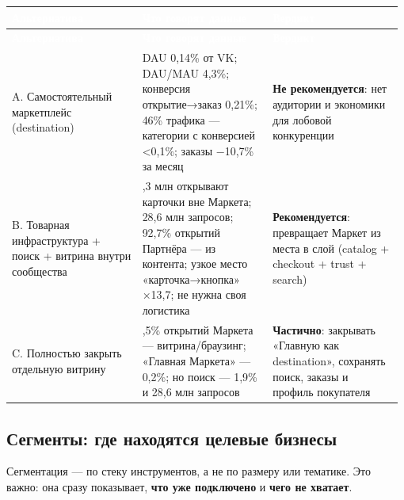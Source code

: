 \documentclass[10pt,a4paper]{article}
\begin{document}
\begingroup
\small
\setlength{\tabcolsep}{3pt}
\renewcommand{\arraystretch}{1.12}
\begin{longtable}{@{}>{\raggedright\arraybackslash}p{0.3251\linewidth}>{\raggedright\arraybackslash}p{0.3251\linewidth}>{\raggedright\arraybackslash}p{0.3251\linewidth}@{}}
\rowcolor{blue}
\textcolor{white}{\textbf{Альтернатива}} & \textcolor{white}{\textbf{Что говорят данные}} & \textcolor{white}{\textbf{Вердикт}} \\
\endfirsthead
\rowcolor{blue}
\textcolor{white}{\textbf{Альтернатива}} & \textcolor{white}{\textbf{Что говорят данные}} & \textcolor{white}{\textbf{Вердикт}} \\
\endhead
\hline
A. Самостоятельный маркетплейс (destination) & DAU 0,14\% от VK; DAU/MAU 4,3\%; конверсия открытие→заказ 0,21\%; 46\% трафика — категории с конверсией <0,1\%; заказы −10,7\% за месяц & \textbf{Не рекомендуется}: нет аудитории и экономики для лобовой конкуренции \\
B. Товарная инфраструктура + поиск + витрина внутри сообщества & 27,3 млн открывают карточки вне Маркета; 28,6 млн запросов; 92,7\% открытий Партнёра — из контента; узкое место «карточка→кнопка» ×13,7; не нужна своя логистика & \textbf{Рекомендуется}: превращает Маркет из места в слой (catalog + checkout + trust + search) \\
C. Полностью закрыть отдельную витрину & 79,5\% открытий Маркета — витрина/браузинг; «Главная Маркета» — 0,2\%; но поиск — 1,9\% и 28,6 млн запросов & \textbf{Частично}: закрывать «Главную как destination», сохранять поиск, заказы и профиль покупателя \\
\hline
\end{longtable}
\endgroup
\vspace{4pt}

\subsection{Сегменты: где находятся целевые бизнесы}

Сегментация — по стеку инструментов, а не по размеру или тематике. Это важно: она сразу показывает, \textbf{что уже подключено} и \textbf{чего не хватает}.\par
\end{document}
